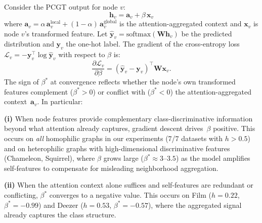 
\begin{proposition}
\label{prop:beta}
Consider the PCGT output for node $v$:
\begin{equation}
    \mathbf{h}_v = \mathbf{a}_v + \beta \, \mathbf{x}_v
\end{equation}
where $\mathbf{a}_v = \alpha \, \mathbf{a}_v^{\mathrm{local}} + (1-\alpha)\,\mathbf{a}_v^{\mathrm{global}}$ is the attention-aggregated context and $\mathbf{x}_v$ is node $v$'s transformed feature.
Let $\hat{\mathbf{y}}_v = \mathrm{softmax}(\mathbf{W}\mathbf{h}_v)$ be the predicted distribution and $\mathbf{y}_v$ the one-hot label.
The gradient of the cross-entropy loss $\mathcal{L}_v = -\mathbf{y}_v^\top \log \hat{\mathbf{y}}_v$ with respect to $\beta$ is:
\begin{equation}
    \frac{\partial \mathcal{L}_v}{\partial \beta}
    = (\hat{\mathbf{y}}_v - \mathbf{y}_v)^\top \mathbf{W} \mathbf{x}_v .
    \label{eq:beta_grad}
\end{equation}
The sign of $\beta^*$ at convergence reflects whether the node's own
transformed features complement ($\beta^* > 0$) or conflict with
($\beta^* < 0$) the attention-aggregated context~$\mathbf{a}_v$.
In particular:

\textbf{(i)} When node features provide complementary class-discriminative
information beyond what attention already captures, gradient descent
drives~$\beta$ positive.
This occurs on \emph{all} homophilic graphs in our experiments
(7/7 datasets with $h > 0.5$) and on heterophilic graphs with
high-dimensional discriminative features (Chameleon, Squirrel),
where $\beta$ grows large ($\beta^* \approx 3$--$3.5$) as the
model amplifies self-features to compensate for misleading
neighborhood aggregation.

\textbf{(ii)} When the attention context alone suffices and self-features
are redundant or conflicting, $\beta^*$ converges to a negative value.
This occurs on Film ($h{=}0.22$, $\beta^*{=}{-}0.99$) and
Deezer ($h{=}0.53$, $\beta^*{=}{-}0.57$), where
the aggregated signal already captures the class structure.
\end{proposition}

